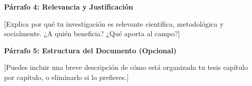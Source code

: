 \textbf{Párrafo 4: Relevancia y Justificación}

{[Explica por qué tu investigación es relevante científica, metodológica y socialmente. ¿A quién beneficia? ¿Qué aporta al campo?]}

\textbf{Párrafo 5: Estructura del Documento (Opcional)}

{[Puedes incluir una breve descripción de cómo está organizada tu tesis capítulo por capítulo, o eliminarlo si lo prefieres.]}

%
%
%
%
%

